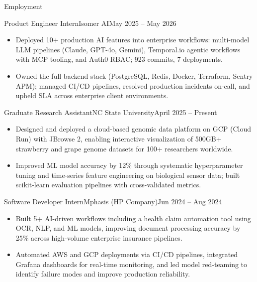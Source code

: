 \documentclass[]{mcdowellcv}
\begin{document}
\makeheader

\begin{cvsection}{Employment}
  \begin{cvsubsection}{Product Engineer Intern}{Isomer AI}{May 2025 -- May 2026}
    \begin{itemize}
      \item Deployed 10+ production AI features into enterprise workflows: multi-model LLM pipelines (Claude, GPT-4o, Gemini), Temporal.io agentic workflows with MCP tooling, and Auth0 RBAC; 923 commits, 7 deployments.
      \item Owned the full backend stack (PostgreSQL, Redis, Docker, Terraform, Sentry APM); managed CI/CD pipelines, resolved production incidents on-call, and upheld SLA across enterprise client environments.
    \end{itemize}
    \vspace{-1.5pt}
  \end{cvsubsection}

  \begin{cvsubsection}{Graduate Research Assistant}{NC State University}{April 2025 -- Present}
    \begin{itemize}
      \item Designed and deployed a cloud-based genomic data platform on GCP (Cloud Run) with JBrowse 2, enabling interactive visualization of 500GB+ strawberry and grape genome datasets for 100+ researchers worldwide.
      \item Improved ML model accuracy by 12\% through systematic hyperparameter tuning and time-series feature engineering on biological sensor data; built scikit-learn evaluation pipelines with cross-validated metrics.
    \end{itemize}
    \vspace{-1.5pt}
  \end{cvsubsection}

  \begin{cvsubsection}{Software Developer Intern}{Mphasis (HP Company)}{Jun 2024 -- Aug 2024}
    \begin{itemize}
      \item Built 5+ AI-driven workflows including a health claim automation tool using OCR, NLP, and ML models, improving document processing accuracy by 25\% across high-volume enterprise insurance pipelines.
      \item Automated AWS and GCP deployments via CI/CD pipelines, integrated Grafana dashboards for real-time monitoring, and led model red-teaming to identify failure modes and improve production reliability.
    \end{itemize}
    \vspace{-1.5pt}
  \end{cvsubsection}


\end{cvsection}
\end{document}
